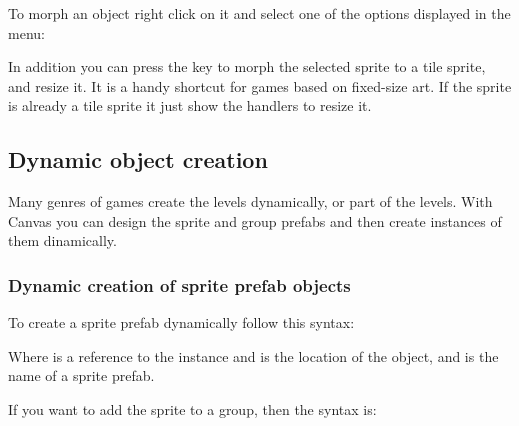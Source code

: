 \documentclass[letterpaper,10pt,english]{sphinxmanual}
\begin{document}
To morph an object right click on it and select one of the options displayed in the  menu:

\noindent{}

In addition you can press the  key to morph the selected sprite to a tile sprite, and resize it. It is a handy shortcut for games based on fixed-size art. If the sprite is already a tile sprite it just show the handlers to resize it.


\subsection{Dynamic object creation}
\label{\detokenize{canvas:dynamic-object-creation}}
Many genres of games create the levels dynamically, or part of the levels. With Canvas you can design the sprite and group prefabs and then create instances of them dinamically.


\subsubsection{Dynamic creation of sprite prefab objects}
\label{\detokenize{canvas:dynamic-creation-of-sprite-prefab-objects}}
To create a sprite prefab dynamically follow this syntax:

\begin{sphinxVerbatim}[commandchars=\\\{\}]
      
\end{sphinxVerbatim}

Where  is a reference to the  instance and  is the location of the object, and  is the name of a sprite prefab.

If you want to add the sprite to a group, then the syntax is:

\begin{sphinxVerbatim}[commandchars=\\\{\}]
      
\end{sphinxVerbatim}
\end{document}
